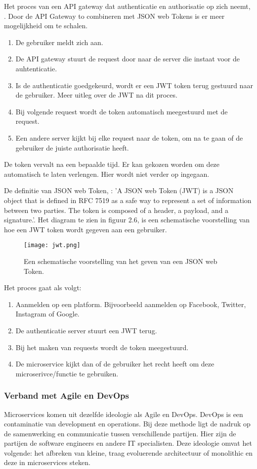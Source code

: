 Het proces van een API gateway dat authenticatie en authorisatie op zich neemt, \textcite{Siraj2017}.
Door de API Gateway to combineren met JSON  web Tokens is er meer mogelijkheid om te schalen. 
\begin{enumerate}
	\item De gebruiker meldt zich aan.
	\item De API gateway stuurt de request door naar de server die instaat voor de auhtenticatie.
	\item Is de authenticatie goedgekeurd, wordt er een JWT token terug gestuurd naar de gebruiker. Meer uitleg over de JWT na dit proces.
	\item Bij volgende request wordt de token automatisch meegestuurd met de request.
	\item Een andere server kijkt bij elke request naar de token, om na te gaan of de gebruiker de juiste authorisatie heeft. 
\end{enumerate}
De token vervalt na een bepaalde tijd. Er kan gekozen worden om deze automatisch te laten verlengen. Hier wordt niet verder op ingegaan. 

De definitie van JSON  web Token, \textcite{Stecky-Efantis2016}: 'A JSON  web Token (JWT) is a JSON object that is defined in RFC 7519 as a safe way to represent a set of information between two parties. The token is composed of a header, a payload, and a signature.'. Het diagram te zien in figuur 2.6, is een schematische voorstelling van hoe een JWT token wordt gegeven aan een gebruiker.
\begin{figure}[h]
	\texttt{[image: jwt.png]}
	\centering
	\caption{Een schematische voorstelling van het geven van een JSON  web Token. \textcite{Stecky-Efantis2016}}
\end{figure}
Het proces gaat als volgt:
\begin{enumerate}
	\item Aanmelden op een platform. Bijvoorbeeld aanmelden op Facebook, Twitter, Instagram of Google.
	\item De authenticatie server stuurt een JWT terug.
	\item Bij het maken van requests wordt de token meegestuurd.
	\item De microservice kijkt dan of de gebruiker het recht heeft om deze microserivce/functie te gebruiken.
\end{enumerate}


\subsubsection{Verband met Agile en DevOps}
Microservices komen uit dezelfde ideologie als Agile en DevOps. DevOps is een contaminatie  van development en operations. Bij deze methode ligt de nadruk op de samenwerking en communicatie tussen verschillende partijen. Hier zijn de partijen de software engineers en andere IT specialisten. Deze ideologie omvat het volgende: het afbreken van kleine, traag evoluerende architectuur of monolithic en deze in microservices steken.

